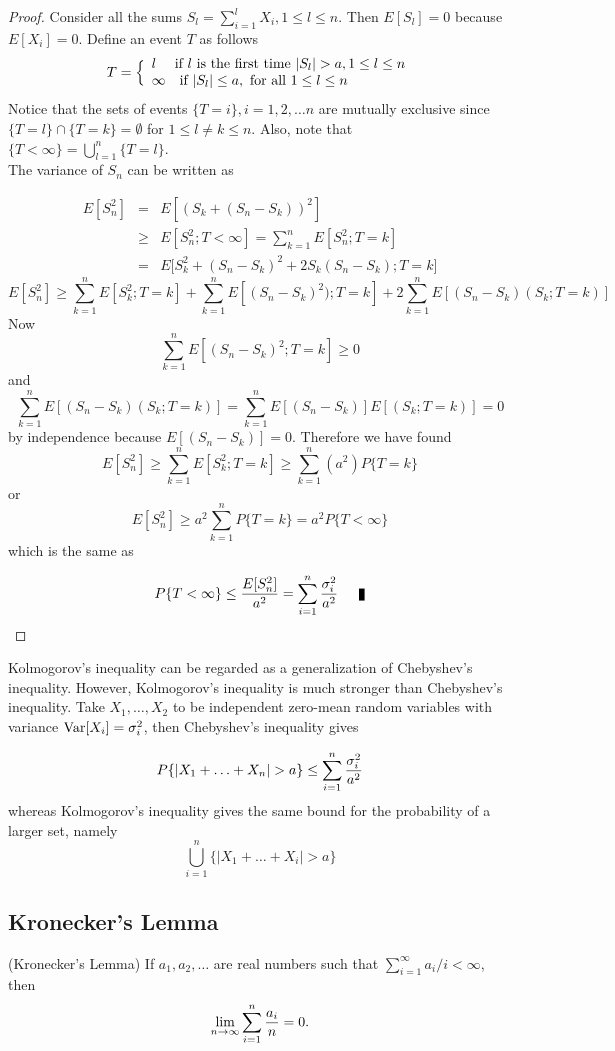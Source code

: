 \begin{proof}
Consider all the sums $S_l = \sum_{i=1}^l X_i, 1\le l \le n$. Then $E[S_l] = 0$ because $E[X_i] = 0$.  Define an event $T$ as follows
$$ T = \Big\{ 
\begin{array}{l}
l \quad \hbox{ if $l$ is the first time}~ |S_l| > a, 1\le l \le n\\
\infty \quad \hbox{if}~ |S_l| \le a, \hbox{~for all~} 1\le l\le  n
\end{array}$$
Notice that the sets of events $\{ T= i \}, i=1,2,\hdots n$ are mutually exclusive since $\{T=l \} \cap \{ T=k\} =\emptyset$ for $1\le l \neq k \le n$. 
Also, note that $\{ T < \infty \} = \bigcup\limits_{l=1}^n \{T = l\}$.\\

The variance of $S_n$ can be written as

\begin{eqnarray*}
E[S_n^2] &=& E[(S_k + (S_n - S_k))^2]\\
&\ge& E[S_n^2; T< \infty] = \sum_{k=1}^nE[S_n^2; T=k] \\
&=& E\Big[ S_k^2 + (S_n-S_k)^2 + 2S_k(S_n-S_k); T=k\Big]
\end{eqnarray*}
$$E[S_n^2] \ge \sum_{k=1}^n E[S_k^2; T=k] + \sum_{k=1}^nE[(S_n-S_k)^2); T = k] + 2\sum_{k=1}^n E[(S_n-S_k) (S_k;T=k)]$$
Now $$\sum_{k=1}^nE[(S_n-S_k)^2; T = k] \ge 0$$ and 
$$\sum_{k=1}^n E[(S_n-S_k) (S_k;T=k)] = \sum_{k=1}^n E[(S_n-S_k)]E[(S_k;T=k)]= 0$$ by independence because $E[(S_n-S_k)] = 0$. Therefore we have found
$$E[S_n^2] \ge \sum_{k=1}^n E[S_k^2; T=k] \ge \sum_{k=1}^n (a^2) P\{ T=k\}$$ or 
$$E[S_n^2] \ge a^2 \sum_{k=1}^n P\{ T=k\} = a^2 P\{ T < \infty\}$$ which is the same as

$$P\{T<\infty\} \le {E[S_n^2]\over a^2} = \sum_{i=1}^n {\sigma_i^2\over a^2} \qed$$ 
\end{proof}

Kolmogorov's inequality can be regarded as a generalization of Chebyshev's inequality. However, 
Kolmogorov's inequality is much stronger than Chebyshev's inequality. Take $X_1, \hdots, X_2$ to be independent zero-mean random variables with variance 
$\hbox{Var}[X_i] = \sigma^2_i$, then Chebyshev's inequality gives

$$P\{|X_1 + \hdots + X_n | > a  \} \le \sum_{i=1}^n {\sigma^2_i\over a^2}$$whereas Kolmogorov's inequality gives the same bound for the probability of a larger set, namely
$$\bigcup\limits_{i=1}^n \{ |X_1 + \hdots + X_i | > a\}  $$
 
\subsection{Kronecker's Lemma}
\begin{proposition}(Kronecker's Lemma) If $a_1, a_2, \hdots $ are real numbers such that $\sum_{i=1}^\infty a_i/i < \infty$, then 
$$\lim_{n\rightarrow\infty} \sum_{i=1}^n {a_i\over n} = 0.$$
\end{proposition}

